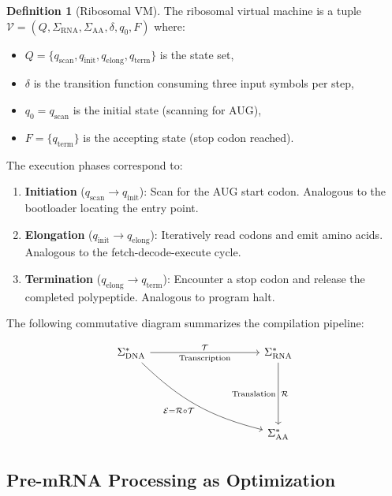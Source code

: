 \documentclass[12pt,a4paper]{article}
\theoremstyle{definition}
\newtheorem{definition}[theorem]{Definition}
\begin{document}
\begin{definition}[Ribosomal VM]\label{def:ribosome-vm}
The ribosomal virtual machine is a tuple $\mathcal{V} = (Q, \Sigma_\mathrm{RNA}, \Sigma_\mathrm{AA}, \delta, q_0, F)$ where:
\begin{itemize}
  \item $Q = \{q_{\text{scan}}, q_{\text{init}}, q_{\text{elong}}, q_{\text{term}}\}$ is the state set,
  \item $\delta$ is the transition function consuming three input symbols per step,
  \item $q_0 = q_{\text{scan}}$ is the initial state (scanning for AUG),
  \item $F = \{q_{\text{term}}\}$ is the accepting state (stop codon reached).
\end{itemize}
The execution phases correspond to:
\begin{enumerate}
  \item \textbf{Initiation} ($q_{\text{scan}} \to q_{\text{init}}$): Scan for the AUG start codon. Analogous to the bootloader locating the entry point.
  \item \textbf{Elongation} ($q_{\text{init}} \to q_{\text{elong}}$): Iteratively read codons and emit amino acids. Analogous to the fetch-decode-execute cycle.
  \item \textbf{Termination} ($q_{\text{elong}} \to q_{\text{term}}$): Encounter a stop codon and release the completed polypeptide. Analogous to program halt.
\end{enumerate}
\end{definition}

The following commutative diagram summarizes the compilation pipeline:

\begin{equation}\label{eq:pipeline-diagram}
\begin{tikzcd}[column sep=3.5cm, row sep=2cm]
  \Sigma_{\mathrm{DNA}}^*
    \arrow[r, "\mathcal{T}" {name=T}, "\text{Transcription}"']
    \arrow[dr, "\mathcal{E} = \mathcal{R} \circ \mathcal{T}"', bend right=15]
  & \Sigma_{\mathrm{RNA}}^*
    \arrow[d, "\mathcal{R}", "\text{Translation}"']
  \\
  & \Sigma_{\mathrm{AA}}^*
\end{tikzcd}
\end{equation}

\subsection{Pre-mRNA Processing as Optimization}
\end{document}
